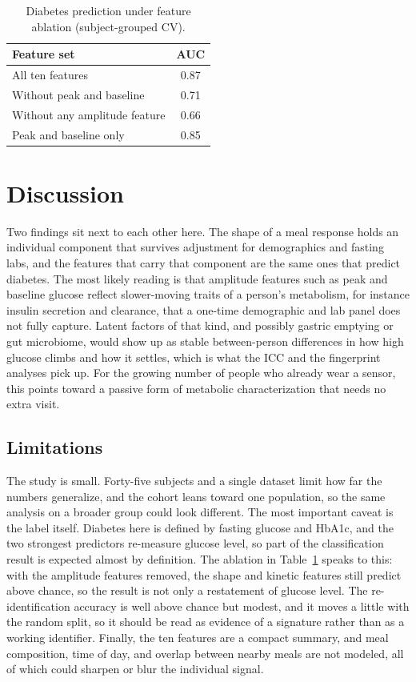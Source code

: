 \documentclass[10pt,conference,compsoc]{IEEEtran}
\begin{document}
\begin{table}[!t]
\centering
\caption{Diabetes prediction under feature ablation (subject-grouped CV).}
\label{tab:ablation}
\begin{tabular}{lc}
\hline
Feature set & AUC \\
\hline
All ten features & 0.87 \\
Without peak and baseline & 0.71 \\
Without any amplitude feature & 0.66 \\
Peak and baseline only & 0.85 \\
\hline
\end{tabular}
\end{table}

\section{Discussion}

Two findings sit next to each other here. The shape of a meal response holds an
individual component that survives adjustment for demographics and fasting labs,
and the features that carry that component are the same ones that predict
diabetes. The most likely reading is that amplitude features such as peak and
baseline glucose reflect slower-moving traits of a person's metabolism, for
instance insulin secretion and clearance, that a one-time demographic and lab
panel does not fully capture. Latent factors of that kind, and possibly gastric
emptying or gut microbiome, would show up as stable between-person differences in
how high glucose climbs and how it settles, which is what the ICC and the
fingerprint analyses pick up. For the growing number of people who already wear a
sensor, this points toward a passive form of metabolic characterization that needs
no extra visit.

\subsection{Limitations}
The study is small. Forty-five subjects and a single dataset limit how far the
numbers generalize, and the cohort leans toward one population, so the same
analysis on a broader group could look different. The most important caveat is the
label itself. Diabetes here is defined by fasting glucose and HbA1c, and the two
strongest predictors re-measure glucose level, so part of the classification
result is expected almost by definition. The ablation in Table~\ref{tab:ablation}
speaks to this: with the amplitude features removed, the shape and kinetic
features still predict above chance, so the result is not only a restatement of
glucose level. The re-identification accuracy is well above chance but
modest, and it moves a little with the random split, so it should be read as
evidence of a signature rather than as a working identifier. Finally, the ten
features are a compact summary, and meal composition, time of day, and overlap
between nearby meals are not modeled, all of which could sharpen or blur the
individual signal.
\end{document}
